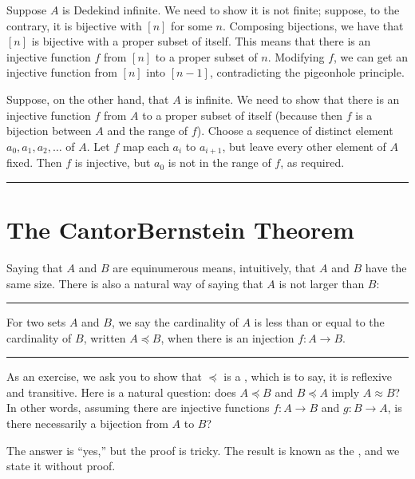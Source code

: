 \documentclass[letterpaper,10pt,english]{sphinxmanual}
\begin{document}
\sphinxAtStartPar
{} Suppose \(A\) is Dedekind infinite. We need to show it is not finite; suppose, to the contrary, it is bijective with \([n]\) for some \(n\). Composing bijections, we have that \([n]\) is bijective with a proper subset of itself. This means that there is an injective function \(f\) from \([n]\) to a proper subset of \(n\). Modifying \(f\), we can get an injective function from \([n]\) into \([n-1]\), contradicting the pigeonhole principle.

\sphinxAtStartPar
Suppose, on the other hand, that \(A\) is infinite. We need to show that there is an injective function \(f\) from \(A\) to a proper subset of itself (because then \(f\) is a bijection between \(A\) and the range of \(f\)). Choose a sequence of distinct element \(a_0, a_1, a_2, \ldots\) of \(A\). Let \(f\) map each \(a_i\) to \(a_{i+1}\), but leave every other element of \(A\) fixed. Then \(f\) is injective, but \(a_0\) is not in the range of \(f\), as required.


\bigskip\hrule\bigskip



\section{The Cantor\sphinxhyphen{}Bernstein Theorem}
\label{\detokenize{the_infinite:the-cantor-bernstein-theorem}}\label{\detokenize{the_infinite:id1}}
\sphinxAtStartPar
Saying that \(A\) and \(B\) are equinumerous means, intuitively, that \(A\) and \(B\) have the same size. There is also a natural way of saying that \(A\) is not larger than \(B\):


\bigskip\hrule\bigskip


\sphinxAtStartPar
{} For two sets \(A\) and \(B\), we say the cardinality of \(A\) is less than or equal to the cardinality of \(B\), written \(A \preceq B\), when there is an injection \(f : A \to B\).


\bigskip\hrule\bigskip


\sphinxAtStartPar
As an exercise, we ask you to show that \(\preceq\) is a , which is to say, it is reflexive and transitive. Here is a natural question: does \(A \preceq B\) and \(B \preceq A\) imply \(A \approx B\)? In other words, assuming there are injective functions \(f : A \to B\) and \(g : B \to A\), is there necessarily a bijection from \(A\) to \(B\)?

\sphinxAtStartPar
The answer is “yes,” but the proof is tricky. The result is known as the , and we state it without proof.
\end{document}
